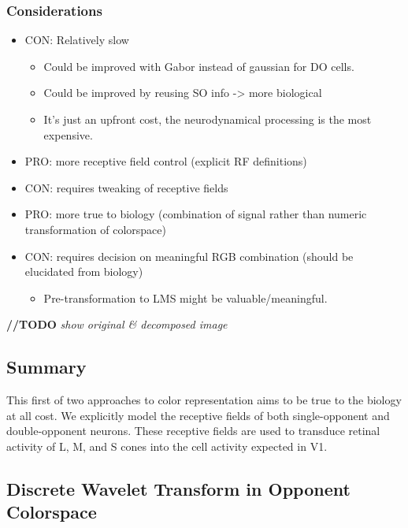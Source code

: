 \documentclass[journal,onecolumn]{IEEEtran}
\begin{document}
\subsubsection{Considerations}
\begin{itemize}
    \item CON: Relatively slow
    \begin{itemize}
        \item Could be improved with Gabor instead of gaussian for DO cells.
        \item Could be improved by reusing SO info -> more biological
        \item It's just an upfront cost, the neurodynamical processing is the most expensive.
    \end{itemize}
    \item PRO: more receptive field control (explicit RF definitions)
    \item CON: requires tweaking of receptive fields
    \item PRO: more true to biology (combination of signal rather than numeric transformation of colorspace)
    \item CON: requires decision on meaningful RGB combination (should be elucidated from biology)
    \begin{itemize}
        \item Pre-transformation to LMS might be valuable/meaningful.
    \end{itemize}
\end{itemize}

\bigskip

\textbf{//TODO} \textit{show original \& decomposed image}

\bigskip

\subsection*{Summary}

This first of two approaches to color representation aims to be true to the biology at all cost. We explicitly model the receptive fields of both single-opponent and double-opponent neurons. These receptive fields are used to transduce retinal activity of L, M, and S cones into the cell activity expected in V1.


\subsection{Discrete Wavelet Transform in Opponent Colorspace}
\end{document}
